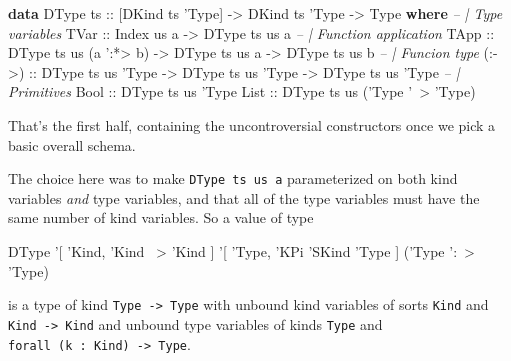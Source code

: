 \documentclass[]{article}
\newenvironment{Shaded}{}{}
\newcommand{\CommentTok}[1]{\textcolor[rgb]{0.38,0.63,0.69}{\textit{#1}}}
\newcommand{\DataTypeTok}[1]{\textcolor[rgb]{0.56,0.13,0.00}{#1}}
\newcommand{\FunctionTok}[1]{\textcolor[rgb]{0.02,0.16,0.49}{#1}}
\newcommand{\KeywordTok}[1]{\textcolor[rgb]{0.00,0.44,0.13}{\textbf{#1}}}
\newcommand{\NormalTok}[1]{#1}
\newcommand{\OtherTok}[1]{\textcolor[rgb]{0.00,0.44,0.13}{#1}}
\begin{document}
\begin{Shaded}
\begin{Highlighting}[]
\KeywordTok{data} \DataTypeTok{DType}\OtherTok{ ts ::}\NormalTok{ [}\DataTypeTok{DKind}\NormalTok{ ts }\DataTypeTok{'Type}\NormalTok{] }\OtherTok{->} \DataTypeTok{DKind}\NormalTok{ ts }\DataTypeTok{'Type} \OtherTok{->} \DataTypeTok{Type} \KeywordTok{where}
    \CommentTok{-- | Type variables}
    \DataTypeTok{TVar}\OtherTok{  ::} \DataTypeTok{Index}\NormalTok{ us a }\OtherTok{->} \DataTypeTok{DType}\NormalTok{ ts us a}
    \CommentTok{-- | Function application}
    \DataTypeTok{TApp}\OtherTok{  ::} \DataTypeTok{DType}\NormalTok{ ts us (a '}\FunctionTok{:*>}\NormalTok{ b) }\OtherTok{->} \DataTypeTok{DType}\NormalTok{ ts us a }\OtherTok{->} \DataTypeTok{DType}\NormalTok{ ts us b}
    \CommentTok{-- | Funcion type}
\OtherTok{    (:->) ::} \DataTypeTok{DType}\NormalTok{ ts us }\DataTypeTok{'Type} \OtherTok{->} \DataTypeTok{DType}\NormalTok{ ts us }\DataTypeTok{'Type} \OtherTok{->} \DataTypeTok{DType}\NormalTok{ ts us }\DataTypeTok{'Type}
    \CommentTok{-- | Primitives}
    \DataTypeTok{Bool}\OtherTok{  ::} \DataTypeTok{DType}\NormalTok{ ts us }\DataTypeTok{'Type}
    \DataTypeTok{List}\OtherTok{  ::} \DataTypeTok{DType}\NormalTok{ ts us (}\DataTypeTok{'Type}\NormalTok{ '}\FunctionTok{~>} \DataTypeTok{'Type}\NormalTok{)}
\end{Highlighting}
\end{Shaded}

That's the first half, containing the uncontroversial constructors once we pick
a basic overall schema.

The choice here was to make \texttt{DType\ ts\ us\ a} parameterized on both kind
variables \emph{and} type variables, and that all of the type variables must
have the same number of kind variables. So a value of type

\begin{Shaded}
\begin{Highlighting}[]
\DataTypeTok{DType}\NormalTok{ '[ }\DataTypeTok{'Kind}\NormalTok{, }\DataTypeTok{'Kind} \FunctionTok{~>} \DataTypeTok{'Kind}\NormalTok{    ]}
\NormalTok{      '[ }\DataTypeTok{'Type}\NormalTok{, }\DataTypeTok{'KPi} \DataTypeTok{'SKind} \DataTypeTok{'Type}\NormalTok{ ]}
\NormalTok{      (}\DataTypeTok{'Type}\NormalTok{ '}\FunctionTok{:~>} \DataTypeTok{'Type}\NormalTok{)}
\end{Highlighting}
\end{Shaded}

is a type of kind \texttt{Type\ -\textgreater{}\ Type} with unbound kind
variables of sorts \texttt{Kind} and \texttt{Kind\ -\textgreater{}\ Kind} and
unbound type variables of kinds \texttt{Type} and
\texttt{forall\ (k\ :\ Kind)\ -\textgreater{}\ Type}.
\end{document}

